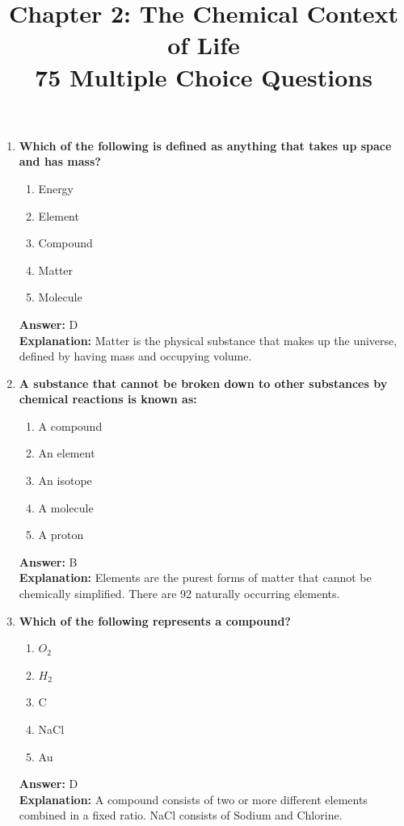 \documentclass[11pt, a4paper]{article}
\title{\textbf{Chapter 2: The Chemical Context of Life \\ 75 Multiple Choice Questions}}
\author{}
\date{}
\begin{document}
\maketitle

\begin{enumerate}


\item \textbf{Which of the following is defined as anything that takes up space and has mass?}
\begin{enumerate}[label=\Alph*.]
    \item Energy
    \item Element
    \item Compound
    \item Matter
    \item Molecule
\end{enumerate}
\textbf{Answer:} D \\
\textbf{Explanation:} Matter is the physical substance that makes up the universe, defined by having mass and occupying volume.

\item \textbf{A substance that cannot be broken down to other substances by chemical reactions is known as:}
\begin{enumerate}[label=\Alph*.]
    \item A compound
    \item An element
    \item An isotope
    \item A molecule
    \item A proton
\end{enumerate}
\textbf{Answer:} B \\
\textbf{Explanation:} Elements are the purest forms of matter that cannot be chemically simplified. There are 92 naturally occurring elements.

\item \textbf{Which of the following represents a compound?}
\begin{enumerate}[label=\Alph*.]
    \item $O_2$
    \item $H_2$
    \item C
    \item NaCl
    \item Au
\end{enumerate}
\textbf{Answer:} D \\
\textbf{Explanation:} A compound consists of two or more different elements combined in a fixed ratio. NaCl consists of Sodium and Chlorine.


\end{enumerate}
\end{document}
